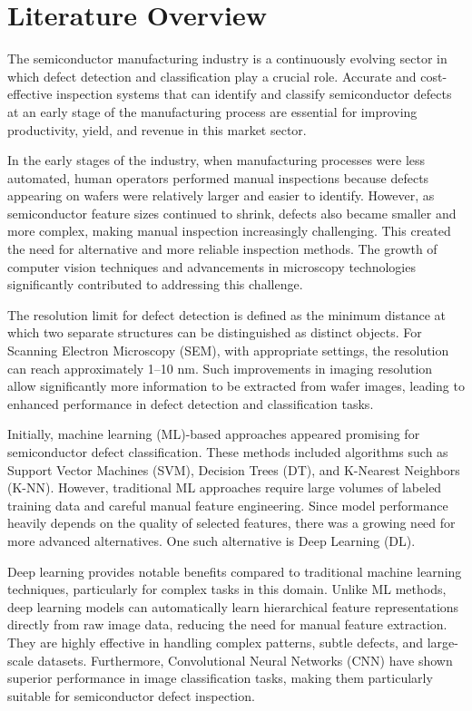 \chapter{Literature Overview}

The semiconductor manufacturing industry is a continuously evolving sector in which defect detection and classification play a crucial role. Accurate and cost-effective inspection systems that can identify and classify semiconductor defects at an early stage of the manufacturing process are essential for improving productivity, yield, and revenue in this market sector.

In the early stages of the industry, when manufacturing processes were less automated, human operators performed manual inspections because defects appearing on wafers were relatively larger and easier to identify. However, as semiconductor feature sizes continued to shrink, defects also became smaller and more complex, making manual inspection increasingly challenging. This created the need for alternative and more reliable inspection methods. The growth of computer vision techniques and advancements in microscopy technologies significantly contributed to addressing this challenge.

The resolution limit for defect detection is defined as the minimum distance at which two separate structures can be distinguished as distinct objects. For Scanning Electron Microscopy (SEM), with appropriate settings, the resolution can reach approximately 1–10 nm. Such improvements in imaging resolution allow significantly more information to be extracted from wafer images, leading to enhanced performance in defect detection and classification tasks.

Initially, machine learning (ML)-based approaches appeared promising for semiconductor defect classification. These methods included algorithms such as Support Vector Machines (SVM), Decision Trees (DT), and K-Nearest Neighbors (K-NN). However, traditional ML approaches require large volumes of labeled training data and careful manual feature engineering. Since model performance heavily depends on the quality of selected features, there was a growing need for more advanced alternatives. One such alternative is Deep Learning (DL).

Deep learning provides notable benefits compared to traditional machine learning techniques, particularly for complex tasks in this domain. Unlike ML methods, deep learning models can automatically learn hierarchical feature representations directly from raw image data, reducing the need for manual feature extraction. They are highly effective in handling complex patterns, subtle defects, and large-scale datasets. Furthermore, Convolutional Neural Networks (CNN) have shown superior performance in image classification tasks, making them particularly suitable for semiconductor defect inspection.

